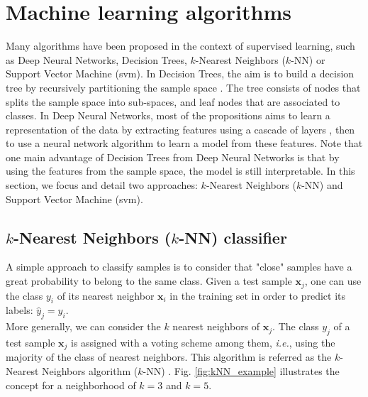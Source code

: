 \newpage
\section{Machine learning algorithms}

Many algorithms have been proposed in the context of supervised learning, such as Deep Neural Networks, Decision Trees, $k$-Nearest Neighbors ($k$-NN) or Support Vector Machine ({\sc svm}). In Decision Trees, the aim is to build a decision tree by recursively partitioning the sample space \cite{Alppaydin2011a}. The tree consists of nodes that splits the sample space into sub-spaces, and leaf nodes that are associated to classes. In Deep Neural Networks, most of the propositions aims to learn a representation of the data by extracting features using a cascade of layers \cite{Lee2009}, then to use a neural network algorithm to learn a model from these features. Note that one main advantage of Decision Trees from Deep Neural Networks is that by using the features from the sample space, the model is still interpretable. In this section, we focus and detail two approaches: $k$-Nearest Neighbors ($k$-NN) and Support Vector Machine ({\sc svm}).


\subsection{$k$-Nearest Neighbors ($k$-NN) classifier}
\label{sec:kNN}

A simple approach to classify samples is to consider that "close" samples have a great probability to belong to the same class. Given a test sample $\textbf{x}_j$, one can use the class $y_i$ of its nearest neighbor $\textbf{x}_i$ in the training set in order to predict its labels: $\hat{y}_j=y_i$. \\
\noindent More generally, we can consider the $k$ nearest neighbors of $\textbf{x}_j$. The class $y_j$ of a test sample $\textbf{x}_j$ is assigned with a voting scheme among them, \textit{i.e.}, using the majority of the class of nearest neighbors. This algorithm is referred as the $k$-Nearest Neighbors algorithm ($k$-NN) 
\cite{Silverman1989,Cover1967b}. Fig. \ref{fig:kNN_example} illustrates the concept for a neighborhood of $k=3$ and $k=5$.

